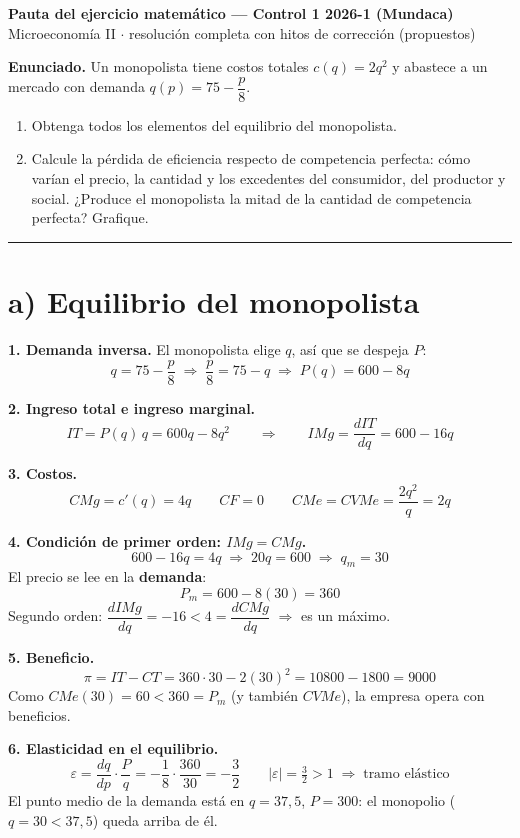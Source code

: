 \documentclass[11pt]{article}
\begin{document}
\begin{center}
{\Large\bfseries Pauta del ejercicio matemático --- Control 1 2026-1 (Mundaca)}\\[3pt]
Microeconomía II $\cdot$ resolución completa con hitos de corrección (propuestos)
\end{center}

\textbf{Enunciado.} Un monopolista tiene costos totales $c(q) = 2q^2$ y abastece a un mercado con demanda $q(p) = 75 - \dfrac{p}{8}$.
\begin{enumerate}[label=\alph*)]
\item Obtenga todos los elementos del equilibrio del monopolista.
\item Calcule la pérdida de eficiencia respecto de competencia perfecta: cómo varían el precio, la cantidad y los excedentes del consumidor, del productor y social. ¿Produce el monopolista la mitad de la cantidad de competencia perfecta? Grafique.
\end{enumerate}

\hrule
\section*{a) Equilibrio del monopolista}

\textbf{1. Demanda inversa.} El monopolista elige $q$, así que se despeja $P$:
\[
q = 75 - \frac{p}{8} \;\Rightarrow\; \frac{p}{8} = 75 - q \;\Rightarrow\; P(q) = 600 - 8q
\]

\textbf{2. Ingreso total e ingreso marginal.}
\[
IT = P(q)\,q = 600q - 8q^2 \qquad\Rightarrow\qquad IMg = \frac{dIT}{dq} = 600 - 16q
\]

\textbf{3. Costos.}
\[
CMg = c'(q) = 4q \qquad CF = 0 \qquad CMe = CVMe = \frac{2q^2}{q} = 2q
\]

\textbf{4. Condición de primer orden: $IMg = CMg$.}
\[
600 - 16q = 4q \;\Rightarrow\; 20q = 600 \;\Rightarrow\; \boxed{q_m = 30}
\]
El precio se lee en la \textbf{demanda}:
\[
P_m = 600 - 8(30) = \boxed{360}
\]
Segundo orden: $\dfrac{dIMg}{dq} = -16 < 4 = \dfrac{dCMg}{dq}$ $\Rightarrow$ es un máximo.

\textbf{5. Beneficio.}
\[
\pi = IT - CT = 360\cdot 30 - 2(30)^2 = 10800 - 1800 = \boxed{9000}
\]
Como $CMe(30) = 60 < 360 = P_m$ (y también $CVMe$), la empresa opera con beneficios.

\textbf{6. Elasticidad en el equilibrio.}
\[
\varepsilon = \frac{dq}{dp}\cdot\frac{P}{q} = -\frac{1}{8}\cdot\frac{360}{30} = \boxed{-\frac{3}{2}} \qquad |\varepsilon| = \tfrac32 > 1 \;\Rightarrow\; \text{tramo elástico}
\]
El punto medio de la demanda está en $q = 37{,}5$, $P = 300$: el monopolio ($q = 30 < 37{,}5$) queda arriba de él.
\end{document}
